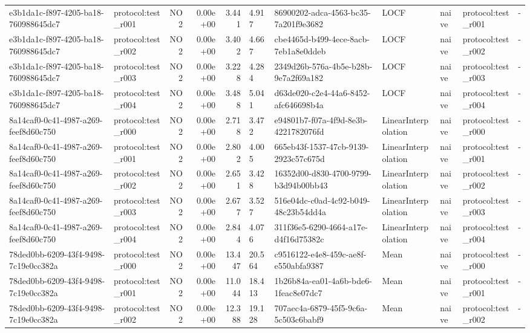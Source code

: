 \begin{table}[htbp]
\begin{tabular}{llrrr}
e3b1da1c-f897-4205-ba18-760988645dc7 & protocol:test\_r001 & NO2 & 0.00e+00 & 3.441 & 4.917 & 86900202-adca-4563-bc35-7a201f9e3682 & LOCF & naive & protocol:test\_r001 & - \\
e3b1da1c-f897-4205-ba18-760988645dc7 & protocol:test\_r002 & NO2 & 0.00e+00 & 3.402 & 4.667 & cbe4465d-b499-4ece-8acb-7eb1a8e0ddeb & LOCF & naive & protocol:test\_r002 & - \\
e3b1da1c-f897-4205-ba18-760988645dc7 & protocol:test\_r003 & NO2 & 0.00e+00 & 3.228 & 4.284 & 2349d26b-576a-4b5e-b28b-9e7a2f69a182 & LOCF & naive & protocol:test\_r003 & - \\
e3b1da1c-f897-4205-ba18-760988645dc7 & protocol:test\_r004 & NO2 & 0.00e+00 & 3.488 & 5.041 & d63de020-c2e4-44a6-8452-afc646698b4a & LOCF & naive & protocol:test\_r004 & - \\
8a14caf0-0c41-4987-a269-feef8d60c750 & protocol:test\_r000 & NO2 & 0.00e+00 & 2.718 & 3.472 & e94801b7-f07a-4f9d-8e3b-4221782076fd & LinearInterpolation & naive & protocol:test\_r000 & - \\
8a14caf0-0c41-4987-a269-feef8d60c750 & protocol:test\_r001 & NO2 & 0.00e+00 & 2.802 & 4.005 & 665eb43f-1537-47cb-9139-2923c57c675d & LinearInterpolation & naive & protocol:test\_r001 & - \\
8a14caf0-0c41-4987-a269-feef8d60c750 & protocol:test\_r002 & NO2 & 0.00e+00 & 2.651 & 3.428 & 16352d00-d830-4700-9799-b3d94b00bb43 & LinearInterpolation & naive & protocol:test\_r002 & - \\
8a14caf0-0c41-4987-a269-feef8d60c750 & protocol:test\_r003 & NO2 & 0.00e+00 & 2.677 & 3.527 & 516e04dc-c0ad-4c92-b049-48c23b54dd4a & LinearInterpolation & naive & protocol:test\_r003 & - \\
8a14caf0-0c41-4987-a269-feef8d60c750 & protocol:test\_r004 & NO2 & 0.00e+00 & 2.844 & 4.076 & 311f36e5-6290-4664-a17e-d4f16d75382c & LinearInterpolation & naive & protocol:test\_r004 & - \\
78ded0bb-6209-43f4-9498-7c19e0cc382a & protocol:test\_r000 & NO2 & 0.00e+00 & 13.447 & 20.564 & c9516122-e4e8-459c-ae8f-e550abfa9387 & Mean & naive & protocol:test\_r000 & - \\
78ded0bb-6209-43f4-9498-7c19e0cc382a & protocol:test\_r001 & NO2 & 0.00e+00 & 11.044 & 18.413 & 1b26b84a-ea01-4a6b-bde6-1feac8e07dc7 & Mean & naive & protocol:test\_r001 & - \\
78ded0bb-6209-43f4-9498-7c19e0cc382a & protocol:test\_r002 & NO2 & 0.00e+00 & 12.388 & 19.128 & 707aec4a-6879-45f5-9c6a-5c503c6babf9 & Mean & naive & protocol:test\_r002 & - \\

\end{tabular}
\end{table}
